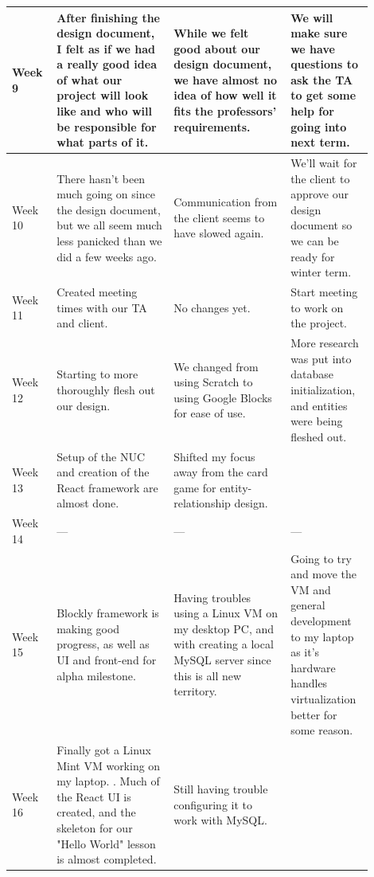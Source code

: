 \documentclass[draftclsnofoot,10pt,onecolumn]{IEEEtran}
\begin{document}
\begin{longtable}{p{0.1\linewidth}p{0.3\linewidth}p{0.3\linewidth}p{0.2\linewidth}}
            \hline
             Week 9
             & After finishing the design document, I felt as if we had a really good idea of what our project will look like and who will be responsible for what parts of it.
             & While we felt good about our design document, we have almost no idea of how well it fits the professors' requirements.
             & We will make sure we have questions to ask the TA to get some help for going into next term.\\
            \hline
             Week 10
             & There hasn't been much going on since the design document, but we all seem much less panicked than we did a few weeks ago.
             & Communication from the client seems to have slowed again.
             & We'll wait for the client to approve our design document so we can be ready for winter term.\\
            \hline
            Week 11
            & Created meeting times with our TA and client.
            & No changes yet.
            & Start meeting to work on the project.\\
            \hline
            Week 12
            & Starting to more thoroughly flesh out our design.
            & We changed from using Scratch to using Google Blocks for ease of use.
            & More research was put into database initialization, and entities were being fleshed out.\\
            \hline
            Week 13
            & Setup of the NUC and creation of the React framework are almost done. 
            & Shifted my focus away from the card game for entity-relationship design.
            & \\
            \hline
            Week 14
            & ---
            & ---
            & --- \\
            \hline
            Week 15
            & Blockly framework is making good progress, as well as UI and front-end for alpha milestone. 
            & Having troubles using a Linux VM on my desktop PC, and with creating a local MySQL server since this is all new territory.
            & Going to try and move the VM and general development to my laptop as it's hardware handles virtualization better for some reason.\\
            \hline
            Week 16
            & Finally got a Linux Mint VM working on my laptop. . Much of the React UI is created, and the skeleton for our "Hello World" lesson is almost completed.
            & Still having trouble configuring it to work with MySQL.

\end{longtable}
\end{document}
